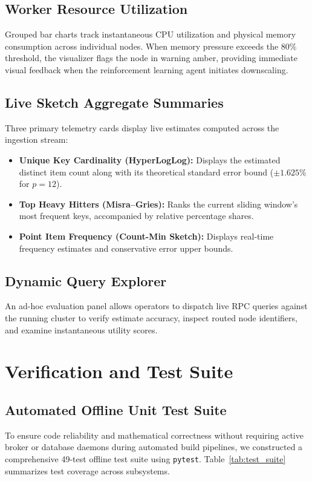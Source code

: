 \subsection{Worker Resource Utilization}
Grouped bar charts track instantaneous CPU utilization and physical memory consumption across individual nodes. When memory pressure exceeds the $80\%$ threshold, the visualizer flags the node in warning amber, providing immediate visual feedback when the reinforcement learning agent initiates downscaling.

\subsection{Live Sketch Aggregate Summaries}
Three primary telemetry cards display live estimates computed across the ingestion stream:
\begin{itemize}
 \item \textbf{Unique Key Cardinality (HyperLogLog):} Displays the estimated distinct item count along with its theoretical standard error bound ($\pm 1.625\%$ for $p=12$).
 \item \textbf{Top Heavy Hitters (Misra--Gries):} Ranks the current sliding window's most frequent keys, accompanied by relative percentage shares.
 \item \textbf{Point Item Frequency (Count-Min Sketch):} Displays real-time frequency estimates and conservative error upper bounds.
\end{itemize}

\subsection{Dynamic Query Explorer}
An ad-hoc evaluation panel allows operators to dispatch live RPC queries against the running cluster to verify estimate accuracy, inspect routed node identifiers, and examine instantaneous utility scores.

\section{Verification and Test Suite}

\subsection{Automated Offline Unit Test Suite}
To ensure code reliability and mathematical correctness without requiring active broker or database daemons during automated build pipelines, we constructed a comprehensive 49-test offline test suite using \texttt{pytest}. Table~\ref{tab:test_suite} summarizes test coverage across subsystems.

